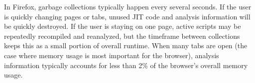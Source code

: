 In Firefox, garbage collections typically happen every several seconds.
If the user is quickly changing pages or tabs, unused JIT code and analysis
information will be quickly destroyed.
If the user is staying on one page, active scripts may be repeatedly
recompiled and reanalyzed, but the timeframe between collections keeps this
as a small portion of overall runtime.
When many tabs are open (the case where memory usage is most important
for the browser), analysis information typically accounts
for less than 2\% of the browser's overall memory usage.

